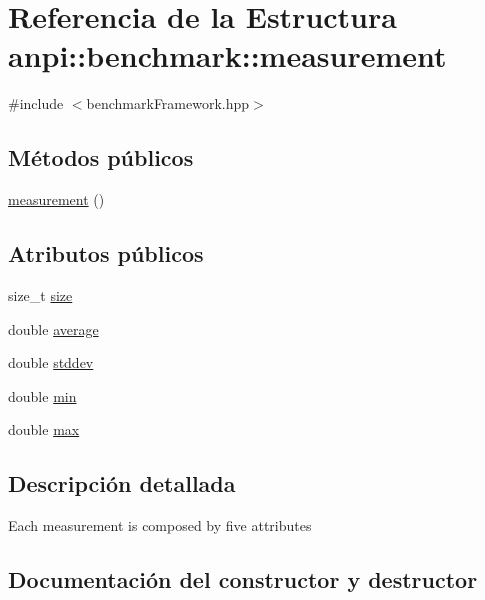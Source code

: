 \hypertarget{structanpi_1_1benchmark_1_1measurement}{}\section{Referencia de la Estructura anpi\+:\+:benchmark\+:\+:measurement}
\label{structanpi_1_1benchmark_1_1measurement}


{\ttfamily \#include $<$benchmark\+Framework.\+hpp$>$}

\subsection*{Métodos públicos}
\begin{DoxyCompactItemize}
\item 
\hyperlink{structanpi_1_1benchmark_1_1measurement_aa32981b7dd01f1d960173c31631068ff}{measurement} ()
\end{DoxyCompactItemize}
\subsection*{Atributos públicos}
\begin{DoxyCompactItemize}
\item 
size\+\_\+t \hyperlink{structanpi_1_1benchmark_1_1measurement_afe0cb29662f49075ef729d726d8909da}{size}
\item 
double \hyperlink{structanpi_1_1benchmark_1_1measurement_a5042a3e3484c5867043109ea00e58051}{average}
\item 
double \hyperlink{structanpi_1_1benchmark_1_1measurement_a24c713323a95c68d1e4b510e5aebfe7e}{stddev}
\item 
double \hyperlink{structanpi_1_1benchmark_1_1measurement_aa828898bfade7034026d8e6167288a97}{min}
\item 
double \hyperlink{structanpi_1_1benchmark_1_1measurement_a82b78290c5c00f8b5e612dd71b0568d5}{max}
\end{DoxyCompactItemize}


\subsection{Descripción detallada}
Each measurement is composed by five attributes 

\subsection{Documentación del constructor y destructor}
\mbox{\label{structanpi_1_1benchmark_1_1measurement_aa32981b7dd01f1d960173c31631068ff}} 
